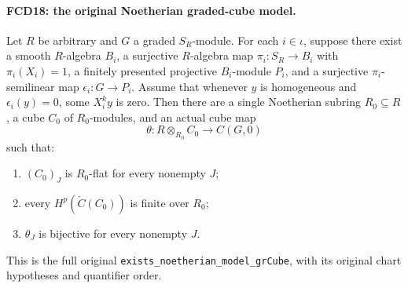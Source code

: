 \paragraph{FCD18: the original Noetherian graded-cube model.}
\label{claim:FCD18}
Let $R$ be arbitrary and $G$ a graded $S_R$-module.  For each
$i\in\iota$, suppose there exist a smooth $R$-algebra $B_i$,
a surjective $R$-algebra map $\pi_i:S_R\to B_i$ with
$\pi_i(X_i)=1$, a finitely presented projective $B_i$-module
$P_i$, and a surjective $\pi_i$-semilinear map
$\epsilon_i:G\to P_i$.  Assume that whenever $y$ is
homogeneous and $\epsilon_i(y)=0$, some $X_i^ky$ is zero.
Then there are a single Noetherian subring $R_0\subseteq R$,
a cube $C_0$ of $R_0$-modules, and an actual cube map
\[
 \theta:R\otimes_{R_0}C_0\longrightarrow C(G,0)       \tag{FCD.18}\label{FCD.18}
\]
such that:
\begin{enumerate}
\item $(C_0)_J$ is $R_0$-flat for every nonempty $J$;
\item every $H^p(\check C(C_0))$ is finite over $R_0$;
\item $\theta_J$ is bijective for every nonempty $J$.
\end{enumerate}
This is the full original
\texttt{exists\_\allowbreak{}noetherian\_\allowbreak{}model\_\allowbreak{}gr\allowbreak{}Cube}, with its original
chart hypotheses and quantifier order.

